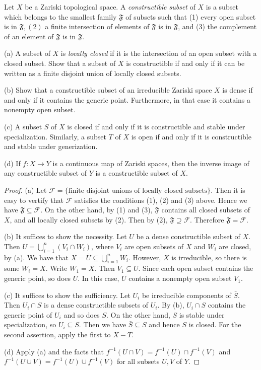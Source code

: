 \begin{exe}
	\label{2.3.18}
	Let $X$ be a Zariski topological space. A \emph{constructible subset} of $X$ is a subset which belongs to the smallest family $\mathfrak{F}$ of subsets such that (1) every open subset is in $\mathfrak{F},(2)$ a finite intersection of elements of $\mathfrak{F}$ is in $\mathfrak{F}$, and (3) the complement of an element of $\mathfrak{F}$ is in $\mathfrak{F}$.
	
	(a) A subset of $X$ is \emph{locally closed} if it is the intersection of an open subset with a closed subset. Show that a subset of $X$ is constructible if and only if it can be written as a finite disjoint union of locally closed subsets.
	
	(b) Show that a constructible subset of an irreducible Zariski space $X$ is dense if and only if it contains the generic point. Furthermore, in that case it contains a nonempty open subset.
	
	(c) A subset $S$ of $X$ is closed if and only if it is constructible and stable under specialization. Similarly, a subset $T$ of $X$ is open if and only if it is constructible and stable under generization.
	
	(d) If $f: X \rightarrow Y$ is a continuous map of Zariski spaces, then the inverse image of any constructible subset of $Y$ is a constructible subset of $X$.
\end{exe}
\begin{proof}
	(a) Let $\mathscr{F}=\{\text{finite disjoint unions of locally closed subsets}\}$. Then it is easy to vertify that $\mathscr{F}$ satisfies the conditions (1), (2) and (3) above. Hence we have $\mathfrak{F}\subseteq\mathscr{F}$. On the other hand, by (1) and (3), $\mathfrak{F}$ contains all closed subsets of $X$, and all locally closed subsets by (2). Then by (2), $\mathfrak{F}\supseteq\mathscr{F}$. Therefore $\mathfrak{F}=\mathscr{F}$.
	
	(b) It suffices to show the necessity. Let $U$ be a dense constructible subset of $X$. Then $U=\bigcup_{i=1}^n(V_i\cap W_i)$, where $V_i$ are open subsets of $X$ and $W_i$ are closed, by (a). We have that $X=\bar{U}\subseteq\bigcup_{i=1}^nW_i$. However, $X$ is irreducible, so there is some $W_i=X$. Write $W_1=X$. Then $V_1\subseteq U$. Since each open subset contains the generic point, so does $U$. In this case, $U$ contains a nonempty open subset $V_1$.
	
	(c) It suffices to show the sufficiency. Let $U_i$ be irreducible components of $\bar{S}$. Then $U_i\cap S$ is a dense constructible subsets of $U_i$. By (b), $U_i\cap S$ contains the generic point of $U_i$ and so does $S$. On the other hand, $S$ is stable under specialization, so $U_i\subseteq S$. Then we have $\bar{S}\subseteq S$ and hence $S$ is closed. For the second assertion, apply the first to $X-T$.
	
	(d) Apply (a) and the facts that $f^{-1}(U\cap V)=f^{-1}(U)\cap f^{-1}(V)$ and $f^{-1}(U\cup V)=f^{-1}(U)\cup f^{-1}(V)$ for all subsets $U,V$ of $Y$.
\end{proof}
